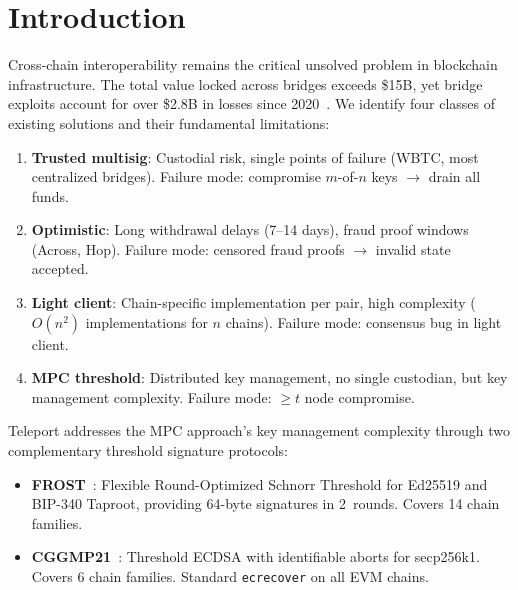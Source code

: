 \documentclass[11pt]{article}
\begin{document}
\tableofcontents

\section{Introduction}
\label{sec:intro}

Cross-chain interoperability remains the critical unsolved problem in blockchain infrastructure. The total value locked across bridges exceeds \$15B, yet bridge exploits account for over \$2.8B in losses since 2020~\cite{rekt}. We identify four classes of existing solutions and their fundamental limitations:

\begin{enumerate}[nosep]
  \item \textbf{Trusted multisig}: Custodial risk, single points of failure (WBTC, most centralized bridges). Failure mode: compromise $m$-of-$n$ keys $\to$ drain all funds.
  \item \textbf{Optimistic}: Long withdrawal delays (7--14 days), fraud proof windows (Across, Hop). Failure mode: censored fraud proofs $\to$ invalid state accepted.
  \item \textbf{Light client}: Chain-specific implementation per pair, high complexity ($O(n^2)$ implementations for $n$ chains). Failure mode: consensus bug in light client.
  \item \textbf{MPC threshold}: Distributed key management, no single custodian, but key management complexity. Failure mode: $\geq t$ node compromise.
\end{enumerate}

Teleport addresses the MPC approach's key management complexity through two complementary threshold signature protocols:

\begin{itemize}[nosep]
  \item \textbf{FROST}~\cite{frost}: Flexible Round-Optimized Schnorr Threshold for Ed25519 and BIP-340 Taproot, providing 64-byte signatures in 2~rounds. Covers 14 chain families.
  \item \textbf{CGGMP21}~\cite{cggmp21}: Threshold ECDSA with identifiable aborts for secp256k1. Covers 6 chain families. Standard \texttt{ecrecover} on all EVM chains.
\end{itemize}
\end{document}
